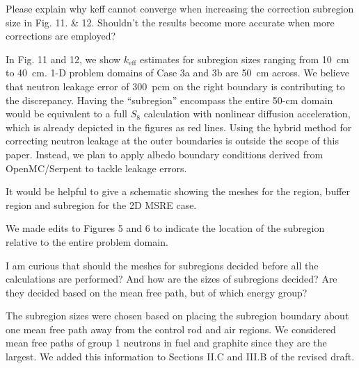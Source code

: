 \documentclass[answers,11pt]{exam}
\begin{document}
\begin{questions}
    \question Please explain why keff cannot converge when increasing the correction subregion size in Fig. 11. \& 12. Shouldn't the results become more accurate when more corrections are employed?
    \begin{solution}
        In Fig. 11 and 12, we show $k_\text{eff}$ estimates for subregion sizes ranging from 10~cm
        to 40~cm. 1-D problem domains of Case 3a and 3b are 50~cm across. We believe that neutron
        leakage error of 300~pcm on the right boundary is contributing to the discrepancy. Having
        the ``subregion''
        encompass the entire 50-cm domain would be equivalent to a full $S_8$ calculation with
        nonlinear diffusion acceleration, which is already depicted in the figures as red lines.
        Using the hybrid method for correcting neutron leakage at the outer boundaries is outside
        the scope of this paper. Instead, we plan to apply albedo boundary conditions derived from
        OpenMC/Serpent to tackle leakage errors.
    \end{solution}

    \question It would be helpful to give a schematic showing the meshes for the region, buffer region and subregion for the 2D MSRE case.
    \begin{solution}
        We made edits to Figures 5 and 6 to indicate the location of the subregion relative to the
        entire problem domain.
    \end{solution}

    \question I am curious that should the meshes for subregions decided before all the calculations are performed? And how are the sizes of subregions decided? Are they decided based on the mean free path, but of which energy group?
    \begin{solution}
        The subregion sizes were chosen based on placing the subregion boundary about one mean
        free path away from the control rod and air regions. We considered mean free paths of
        group 1 neutrons in fuel and graphite since they are the largest. We added this information
        to Sections II.C and III.B of the revised draft.
    \end{solution}


\end{questions}
\end{document}
